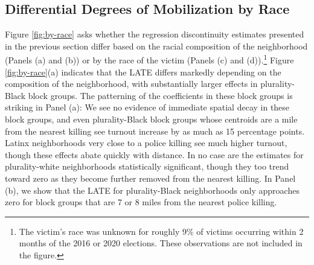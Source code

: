 \documentclass[12pt]{article}
\newcommand{\kmcomment}[1]{\textbf{\textcolor{JungleGreen}{[[ #1 --- KM ]]}}}
\begin{document}

\subsection*{Differential Degrees of Mobilization by Race}


Figure \ref{fig:by-race} asks whether the regression discontinuity estimates presented in the previous section differ based on the racial composition of the neighborhood (Panels (a) and (b)) or by the race of the victim (Panels (c) and (d)).\footnote{The victim's race was unknown for roughly 9\% of victims occurring within 2 months of the 2016 or 2020 elections. These observations are not included in the figure.} Figure \ref{fig:by-race}(a) indicates that the LATE differs markedly depending on the composition of the neighborhood, with substantially larger effects in plurality-Black block groups. The patterning of the coefficients in these block groups is striking in Panel (a): We see no evidence of immediate spatial decay in these block groups, and even plurality-Black block groups whose centroids are a mile from the nearest killing see turnout increase by as much as 15 percentage points. Latinx neighborhoods very close to a police killing see much higher turnout, though these effects abate quickly with distance. In no case are the estimates for plurality-white neighborhoods statistically significant, though they too trend toward zero as they become further removed from the nearest killing. In Panel (b), we show that the LATE for plurality-Black neighborhoods only approaches zero for block groups that are 7 or 8 miles from the nearest police killing.
\end{document}
